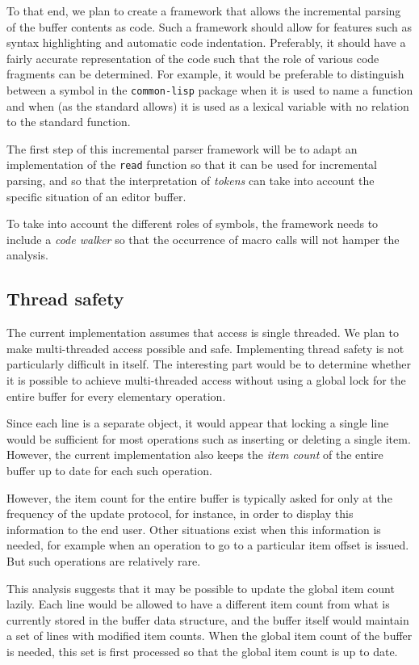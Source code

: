 To that end, we plan to create a framework that allows the incremental
parsing of the buffer contents as \commonlisp{} code.  Such a
framework should allow for features such as syntax highlighting and
automatic code indentation.  Preferably, it should have a fairly
accurate representation of the code such that the role of various code
fragments can be determined.  For example, it would be preferable to
distinguish between a symbol in the \texttt{common-lisp} package when
it is used to name a \commonlisp{} function and when (as the
\commonlisp{} standard allows) it is used as a lexical variable with
no relation to the standard function.

The first step of this incremental parser framework will be to adapt
an implementation of the \commonlisp{} \texttt{read} function so that
it can be used for incremental parsing, and so that the interpretation
of \emph{tokens} can take into account the specific situation of an
editor buffer.

To take into account the different roles of symbols, the framework
needs to include a \emph{code walker} so that the occurrence of macro
calls will not hamper the analysis.

\subsection{Thread safety}

The current implementation assumes that access is single threaded.  We
plan to make multi-threaded access possible and safe.  Implementing
thread safety is not particularly difficult in itself.  The
interesting part would be to determine whether it is possible to
achieve multi-threaded access without using a global lock for the
entire buffer for every elementary operation.

Since each line is a separate object, it would appear that locking a
single line would be sufficient for most operations such as inserting
or deleting a single item.  However, the current implementation also
keeps the \emph{item count} of the entire buffer up to date for each
such operation.

However, the item count for the entire buffer is typically asked for
only at the frequency of the update protocol, for instance, in order
to display this information to the end user.  Other situations exist
when this information is needed, for example when an operation to go
to a particular item offset is issued.  But such operations are
relatively rare.

This analysis suggests that it may be possible to update the global
item count lazily.  Each line would be allowed to have a different
item count from what is currently stored in the buffer data structure,
and the buffer itself would maintain a set of lines with modified item
counts.  When the global item count of the buffer is needed, this set
is first processed so that the global item count is up to date.
